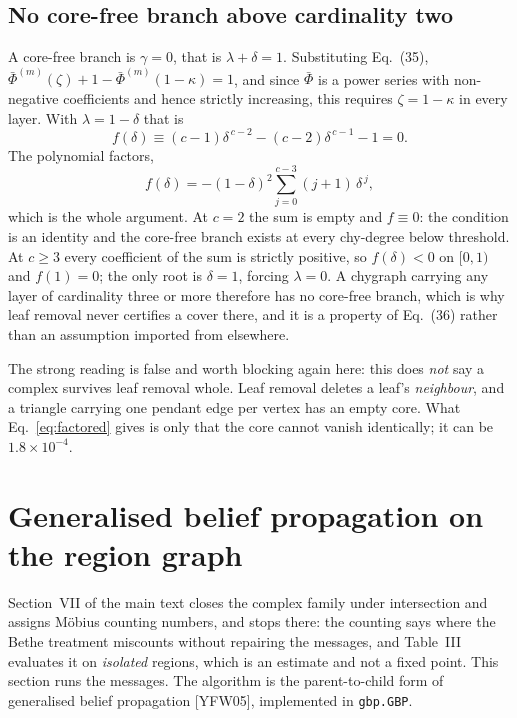 \documentclass[aps,pre,onecolumn,superscriptaddress,floatfix,nofootinbib]{revtex4-2}
\newcommand{\code}[1]{\texttt{#1}}
\begin{document}
\subsection{No core-free branch above cardinality two}

A core-free branch is $\gamma=0$, that is $\lambda+\delta=1$. Substituting
Eq.~(35), $\bar\Phi^{(m)}(\zeta)+1-\bar\Phi^{(m)}(1-\kappa)=1$, and since
$\bar\Phi$ is a power series with non-negative coefficients and hence strictly
increasing, this requires $\zeta=1-\kappa$ in every layer. With
$\lambda=1-\delta$ that is
\begin{equation}
  f(\delta)\equiv(c-1)\delta^{\,c-2}-(c-2)\delta^{\,c-1}-1=0 .
\end{equation}
The polynomial factors,
\begin{equation}
  f(\delta)=-(1-\delta)^{2}\sum_{j=0}^{c-3}(j+1)\,\delta^{\,j},
  \label{eq:factored}
\end{equation}
which is the whole argument. At $c=2$ the sum is empty and $f\equiv0$: the
condition is an identity and the core-free branch exists at every chy-degree
below threshold. At $c\geq3$ every coefficient of the sum is strictly positive,
so $f(\delta)<0$ on $[0,1)$ and $f(1)=0$; the only root is $\delta=1$, forcing
$\lambda=0$. A chygraph carrying any layer of cardinality three or more
therefore has no core-free branch, which is why leaf removal never certifies a
cover there, and it is a property of Eq.~(36) rather than an assumption imported
from elsewhere.

The strong reading is false and worth blocking again here: this does \emph{not}
say a complex survives leaf removal whole. Leaf removal deletes a leaf's
\emph{neighbour}, and a triangle carrying one pendant edge per vertex has an
empty core. What Eq.~\eqref{eq:factored} gives is only that the core cannot
vanish identically; it can be $1.8\times10^{-4}$.

\section{Generalised belief propagation on the region graph}
\label{sec:gbp}

Section~VII of the main text closes the complex family under intersection and
assigns M\"obius counting numbers, and stops there: the counting says where the
Bethe treatment miscounts without repairing the messages, and Table~III evaluates
it on \emph{isolated} regions, which is an estimate and not a fixed point. This
section runs the messages. The algorithm is the parent-to-child form of
generalised belief propagation [YFW05], implemented in \code{gbp.GBP}.
\end{document}
